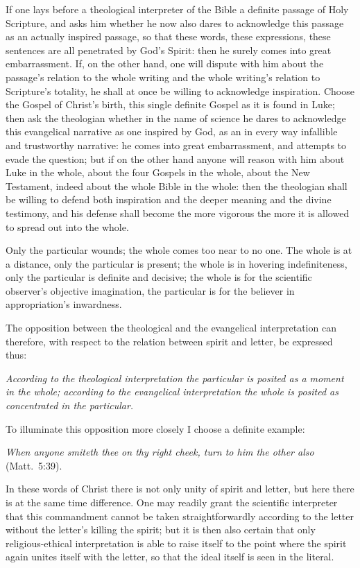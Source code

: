 \documentclass[12pt,a4paper]{book}
\begin{document}
If one lays before a theological interpreter of the Bible a definite passage of Holy
Scripture, and asks him whether he now also dares to acknowledge this passage as an
actually inspired passage, so that these words, these expressions, these sentences
are all penetrated by God's Spirit: then he surely comes into great
embarrassment. If, on the other hand, one will dispute with him about the passage's
relation to the whole writing and the whole writing's relation to Scripture's
totality, he shall at once be willing to acknowledge inspiration. Choose the Gospel
of Christ's birth, this single definite Gospel as it is found in Luke; then ask the
theologian whether in the name of science he dares to acknowledge this evangelical
narrative as one inspired by God, as an in every way infallible and trustworthy
narrative: he comes into great embarrassment, and attempts to evade the question; but
if on the other hand anyone will reason with him about Luke in the whole, about the
four Gospels in the whole, about the New Testament, indeed about the whole Bible in
the whole: then the theologian shall be willing to defend both inspiration and the
deeper meaning and the divine testimony, and his defense shall become the more
vigorous the more it is allowed to spread out into the whole.

Only the particular wounds; the whole comes too near to no one. The whole is at a
distance, only the particular is present; the whole is in hovering indefiniteness,
only the particular is definite and decisive; the whole is for the scientific
observer's objective imagination, the particular is for the believer in
appropriation's inwardness.

The opposition between the theological and the evangelical interpretation can
therefore, with respect to the relation between spirit and letter, be expressed thus:

\emph{According to the theological interpretation the particular is posited as a
moment in the whole; according to the evangelical interpretation the whole is posited
as concentrated in the particular.}

To illuminate this opposition more closely I choose a definite example:

\emph{When anyone smiteth thee on thy right cheek, turn to him the other also}
(Matt.\ 5:39).

In these words of Christ there is not only unity of spirit and letter, but here there
is at the same time difference. One may readily grant the scientific interpreter that
this commandment cannot be taken straightforwardly according to the letter without
the letter's killing the spirit; but it is then also certain that only
religious-ethical interpretation is able to raise itself to the point where the
spirit again unites itself with the letter, so that the ideal itself is seen in the
literal.
\end{document}
